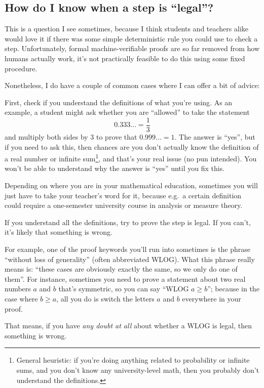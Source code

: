 \documentclass[11pt]{scrartcl}
\begin{document}
\subsection{How do I know when a step is ``legal''?}
This is a question I see sometimes,
because I think students and teachers alike would love it if
there was some simple deterministic rule you could use to check a step.
Unfortunately, formal machine-verifiable proofs
are so far removed from how humans actually work,
it's not practically feasible to do this using some fixed procedure.

Nonetheless, I do have a couple of common cases
where I can offer a bit of advice:
\begin{itemize}
  \ii First,
  \alert{check if you understand the definitions of what you're using}.
  As an example, a student might ask whether you
  are ``allowed'' to take the statement
  \[ 0.333\ldots = \frac13 \]
  and multiply both sides by $3$ to prove that $0.999\ldots = 1$.
  The answer is ``yes'',  but if you need to ask this,
  then chances are you don't actually know the definition
  of a real number or infinite sum\footnote{General heuristic:
    if you're doing anything related to probability or infinite sums,
    and you don't know any university-level math,
    then you probably don't understand the definitions.},
    and that's your real issue (no pun intended).
  You won't be able to understand why the answer is ``yes'' until you fix this.

  Depending on where you are in your mathematical education, sometimes you
  will just have to take your teacher's word for it,
  because e.g.\ a certain definition could require
  a one-semester university course in analysis or measure theory.

  \ii If you understand all the definitions,
  \alert{try to prove the step is legal}.
  If you can't, it's likely that something is wrong.

  For example, one of the proof keywords you'll run into sometimes
  is the phrase ``without loss of generality'' (often abbreviated WLOG).
  What this phrase really means is:
  ``these cases are obviously exactly the same, so we only do one of them''.
  For instance, sometimes you need to prove a statement about two
  real numbers $a$ and $b$ that's symmetric,
  so you can say ``WLOG $a \ge b$'';
  because in the case where $b \ge a$,
  all you do is switch the letters $a$ and $b$ everywhere in your proof.

  That means, if you have \emph{any doubt at all}
  about whether a WLOG is legal, then something is wrong.


\end{itemize}
\end{document}
